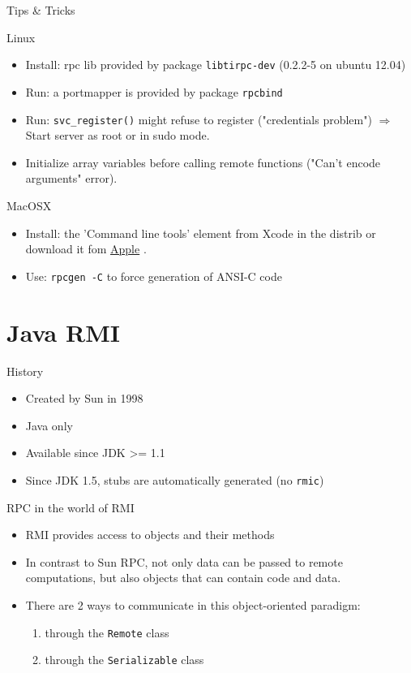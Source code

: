 \documentclass[bigger,hyperref={colorlinks=true, urlcolor=red, plainpages=false, pdfpagelabels, bookmarksnumbered}]{beamer}
\begin{document}
\begin{frame}[fragile,label=sec-2-25]{Tips \& Tricks}
 \begin{block}{Linux}
\begin{itemize}
\item Install: rpc lib provided by package  \texttt{libtirpc-dev}  (0.2.2-5 on ubuntu 12.04)
\item Run: a portmapper is provided by package \texttt{rpcbind}
\item Run: \texttt{svc\_register()} might refuse to register ("credentials problem") 
$\Rightarrow$ Start server as root or in sudo mode.
\item Initialize array variables before calling remote functions 
("Can't encode arguments" error).
\end{itemize}
\end{block}
\begin{block}{MacOSX}
\begin{itemize}
\item Install: the 'Command line tools' element from Xcode in the distrib
or download it fom  \href{https://developer.apple.com/downloads/}{Apple} .
\item Use: \texttt{rpcgen -C} to force generation of ANSI-C code
\end{itemize}
\end{block}
\end{frame}

\section{Java RMI}
\label{sec-3}
\begin{frame}[fragile,label=sec-3-1]{History}
 \begin{itemize}
\item Created by Sun in 1998
\item Java only
\item Available since JDK >= 1.1
\item Since JDK 1.5, stubs are automatically generated (no \texttt{rmic})
\end{itemize}
\end{frame}
\begin{frame}[fragile,label=sec-3-2]{RPC in the world of RMI}
 \begin{itemize}
\item RMI provides access to \alert{objects} and their \alert{methods}
\item In contrast to Sun RPC, not only data can be passed
to remote computations, but also objects that can contain
code and data.\\[5mm]

\item There are 2 ways to communicate in this object-oriented
paradigm: 
\begin{enumerate}
\item through the \texttt{Remote} class
\item through the \texttt{Serializable} class
\end{enumerate}
\end{itemize}
\end{frame}
\end{document}
